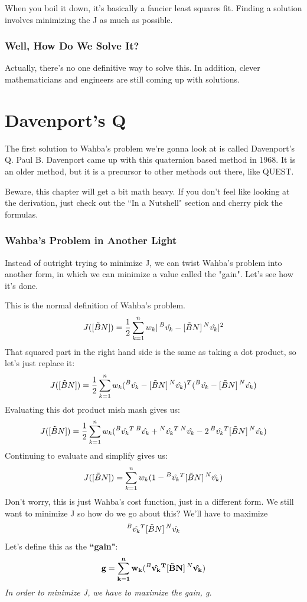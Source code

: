 \documentclass[a4paper,14pt]{extreport}
\newcommand{\vk}[1]{\prescript{#1}{}{\hat{v_k}}}
\begin{document}
When you boil it down, it's basically a fancier least squares fit. Finding a solution involves minimizing the J as much as possible.

\subsection{Well, How Do We Solve It?}
Actually, there's no one definitive way to solve this. In addition, clever mathematicians and engineers are still coming up with solutions.
\chapter{Davenport's Q}
The first solution to Wahba's problem we're gonna look at is called Davenport's Q. Paul B. Davenport came up with this quaternion based method in 1968. It is an older method, but it is a precursor to other methods out there, like QUEST. 

Beware, this chapter will get a bit math heavy. If you don't feel like looking at the derivation, just check out the ``In a Nutshell" section and cherry pick the formulas.

\subsection{Wahba's Problem in Another Light}
Instead of outright trying to minimize J, we can twist Wahba's problem into another form, in which we can minimize a value called the "gain". Let's see how it's done. 

This is the normal definition of Wahba's problem.
\[
J([\tilde{B}N]) = \dfrac{1}{2} \sum^n_{k=1} w_k |\vk{B} - [\tilde{B}N]\vk{N}|^2
\]
That squared part in the right hand side is the same as taking a dot product, so let's just replace it:
\[
J([\tilde{B}N]) = \dfrac{1}{2} \sum^n_{k=1} w_k (\vk{B} - [\tilde{B}N]\vk{N})^T(\vk{B} - [\tilde{B}N]\vk{N})
\]
Evaluating this dot product mish mash gives us:
\[
J([\tilde{B}N]) = \dfrac{1}{2} \sum^n_{k=1} w_k (\vk{B}^T\vk{B}+\vk{N}^T\vk{N}-2\vk{B}^T[\tilde{B}N]\vk{N})
\]
Continuing to evaluate and simplify gives us:
\[
J([\tilde{B}N]) = \sum^n_{k=1} w_k (1- \vk{B}^T[\tilde{B}N]\vk{N})
\]
Don't worry, this is just Wahba's cost function, just in a different form. We still want to minimize J so how do we go about this? We'll have to maximize $$\vk{B}^T[\tilde{B}N]\vk{N}$$ Let's define this as the \textbf{``gain"}:
\[
\mathbf{
g = \sum^n_{k=1} w_k (\vk{B}^T[\tilde{B}N]\vk{N})}
\]
\emph{In order to minimize J, we have to maximize the gain, g.}
\end{document}
